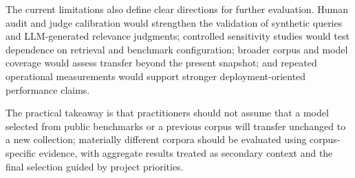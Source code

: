 The current limitations also define clear directions for further evaluation. Human audit and judge calibration would strengthen the validation of synthetic queries and LLM-generated relevance judgments; controlled sensitivity studies would test dependence on retrieval and benchmark configuration; broader corpus and model coverage would assess transfer beyond the present snapshot; and repeated operational measurements would support stronger deployment-oriented performance claims.

The practical takeaway is that practitioners should not assume that a model selected from public benchmarks or a previous corpus will transfer unchanged to a new collection; materially different corpora should be evaluated using corpus-specific evidence, with aggregate results treated as secondary context and the final selection guided by project priorities.

